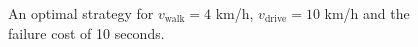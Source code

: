 \begin{figure}[tb]
\begin{center}
\hspace{2mm}
\hspace{2mm}
\end{center}
\caption{An optimal strategy for $v_{\mathrm{walk}} = 4$ km/h, $v_{\mathrm{drive}} = 10$ km/h and the failure cost of 10 seconds.}
\label{fig:w_4_d_10_w_10_log_12_12}
\end{figure}

